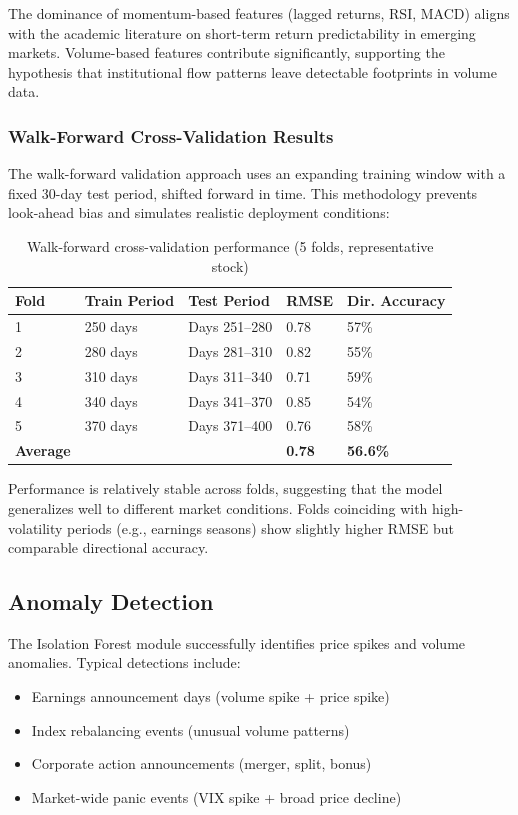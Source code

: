 \documentclass[12pt, a4paper, oneside]{report}
\begin{document}
The dominance of momentum-based features (lagged returns, RSI, MACD) aligns with the academic literature on short-term return predictability in emerging markets. Volume-based features contribute significantly, supporting the hypothesis that institutional flow patterns leave detectable footprints in volume data.

\subsubsection{Walk-Forward Cross-Validation Results}

The walk-forward validation approach uses an expanding training window with a fixed 30-day test period, shifted forward in time. This methodology prevents look-ahead bias and simulates realistic deployment conditions:

\begin{table}[H]
\centering
\caption{Walk-forward cross-validation performance (5 folds, representative stock)}
\label{tab:walkforward}
\begin{tabular}{@{}lllll@{}}
\toprule
\textbf{Fold} & \textbf{Train Period} & \textbf{Test Period} & \textbf{RMSE} & \textbf{Dir. Accuracy} \\
\midrule
1 & 250 days & Days 251--280 & 0.78 & 57\% \\
2 & 280 days & Days 281--310 & 0.82 & 55\% \\
3 & 310 days & Days 311--340 & 0.71 & 59\% \\
4 & 340 days & Days 341--370 & 0.85 & 54\% \\
5 & 370 days & Days 371--400 & 0.76 & 58\% \\
\midrule
\textbf{Average} & & & \textbf{0.78} & \textbf{56.6\%} \\
\bottomrule
\end{tabular}
\end{table}

Performance is relatively stable across folds, suggesting that the model generalizes well to different market conditions. Folds coinciding with high-volatility periods (e.g., earnings seasons) show slightly higher RMSE but comparable directional accuracy.

\subsection{Anomaly Detection}

The Isolation Forest module successfully identifies price spikes and volume anomalies. Typical detections include:
\begin{itemize}[nosep]
    \item Earnings announcement days (volume spike + price spike)
    \item Index rebalancing events (unusual volume patterns)
    \item Corporate action announcements (merger, split, bonus)
    \item Market-wide panic events (VIX spike + broad price decline)
\end{itemize}
\end{document}

